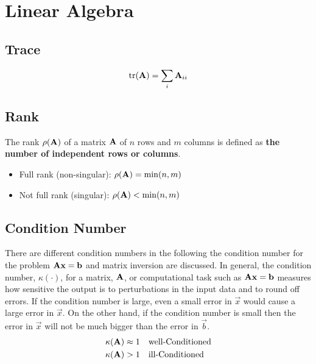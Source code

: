 \chapter{Linear Algebra}


\section{Trace}

\begin{equation}
  \text{tr}({\mathbf{A}}) = \sum_{i} {\mathbf{A}}_{ii}
\end{equation}



\section{Rank}

The rank $\rho({\mathbf{A}})$ of a matrix ${\mathbf{A}}$ of $n$ rows and $m$ columns is
defined as \textbf{the number of independent rows or columns}.

\begin{itemize}
  \item{Full rank (non-singular): $\rho({\mathbf{A}}) = \min(n, m)$}
  \item{Not full rank (singular): $\rho({\mathbf{A}}) < \min(n, m)$}
\end{itemize}



\section{Condition Number}

There are different condition numbers in the following the condition number for
the problem ${\mathbf{A}} {\mathbf{x}} = {\mathbf{b}}$ and matrix inversion are discussed. In
general, the condition number, $\kappa(\cdot)$, for a matrix, ${\mathbf{A}}$, or
computational task such as ${\mathbf{A}} {\mathbf{x}} = {\mathbf{b}}$ measures how sensitive
the output is to perturbations in the input data and to round off errors. If
the condition number is large, even a small error in $\Vec{x}$ would cause a
large error in $\Vec{x}$. On the other hand, if the condition number is small
then the error in $\Vec{x}$ will not be much bigger than the error in
$\Vec{b}$.
%
\begin{align}
  \kappa({\mathbf{A}}) &\approx 1 \quad \text{well-Conditioned} \\
  \kappa({\mathbf{A}}) &> 1 \quad \text{ill-Conditioned}
\end{align}

